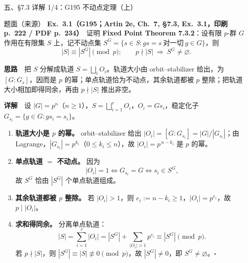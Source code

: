 \documentclass[aspectratio=169,10pt,fontset=none]{ctexbeamer}
\newcommand{\ex}[1]{\textcolor{accent}{\footnotesize\bfseries #1}}
\newcommand{\key}[1]{\textcolor{ink}{\bfseries #1}}
\begin{document}
\begin{frame}[t]{五、\S7.3 详解 1/4：G195 不动点定理（上）}
\label{ex:G195}
\begin{block}{\footnotesize 题面（来源）}
\scriptsize
\textbf{Ex.~3.1（\ex{G195}；Artin 2e, Ch.~7, \S7.3, Ex.~3.1，印刷 p.~222 / PDF p.~234）}\ 
证明 \textbf{Fixed Point Theorem 7.3.2}：设有限 $p$-群 $G$ 作用在有限集 $S$ 上，记不动点集
$S^G=\{s\in S: gs=s\ \text{对一切}\ g\in G\}$，则
\[ |S|\equiv |S^G|\pmod p;\qquad p\nmid |S|\ \Longrightarrow\ S^G\neq\varnothing. \]
\end{block}
{\footnotesize\key{思路}\ \ 把 $S$ 分解成轨道 $S=\bigsqcup_i O_i$。轨道大小由 orbit--stabilizer 给出，为 $[G:G_s]$，因而是 $p$ 的幂；单点轨道恰为不动点，其余轨道都被 $p$ 整除；把轨道大小相加即得同余，再由 $p\nmid|S|$ 推出非空。\par}
{\footnotesize\key{详解}\ \ 设 $|G|=p^n$（$n\ge1$），$S=\bigsqcup_{i=1}^{r}O_i$，$O_i=Gs_i$，稳定化子 $G_{s_i}=\{g\in G:gs_i=s_i\}$。\par}
\begin{enumerate}\setlength{\itemsep}{0.5pt}
\scriptsize
\item \textbf{轨道大小是 $p$ 的幂。} orbit--stabilizer 给出 $|O_i|=[G:G_{s_i}]=|G|/|G_{s_i}|$；由 Lagrange，$|G_{s_i}|=p^{k_i}$（$0\le k_i\le n$），故 $|O_i|=p^{\,n-k_i}$ 是 $p$ 的幂。
\item \textbf{单点轨道 $=$ 不动点。} 因为
\[ |O_i|=1\iff G_{s_i}=G\iff s_i\in S^G, \]
故 $S^G$ 恰由 $|S^G|$ 个单点轨道组成。
\item \textbf{其余轨道都被 $p$ 整除。} 若 $|O_i|>1$，则 $e_i:=n-k_i\ge1$，$|O_i|=p^{e_i}$，故 $p\mid |O_i|$。
\item \textbf{求和得同余。} 分离单点轨道：
\[ |S|=\sum_{i=1}^{r}|O_i|=|S^G|+\sum_{|O_i|>1}p^{e_i}\equiv |S^G|\pmod p. \]
若 $p\nmid |S|$，则 $|S^G|\equiv |S|\not\equiv0\pmod p$，故 $|S^G|\neq0$，即 $S^G\neq\varnothing$。$\square$
\end{enumerate}
\end{frame}
\end{document}
